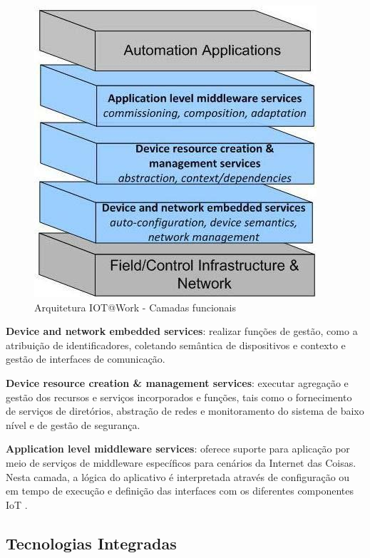 \begin{figure}
\begin{centering}
\includegraphics[width=0.5\linewidth]{Imagens/Cap_3/iot_work}
\par\end{centering}
\caption{Arquitetura IOT@Work - Camadas funcionais \cite{rotondi2011project}\label{fig:iot_work}}
\end{figure}

\textbf{Device and network embedded services}: realizar funções de
gestão, como a atribuição de identificadores, coletando semântica
de dispositivos e contexto e gestão de interfaces de comunicação.

\textbf{Device resource creation \& management services}: executar
agregação e gestão dos recursos e serviços incorporados e funções,
tais como o fornecimento de serviços de diretórios, abstração de redes
e monitoramento do sistema de baixo nível e de gestão de segurança.

\textbf{Application level middleware services}: oferece suporte para
aplicação por meio de serviços de middleware específicos para cenários
da Internet das Coisas. Nesta camada, a lógica do aplicativo é interpretada
através de configuração ou em tempo de execução e definição das interfaces
com os diferentes componentes IoT .

\subsection{Tecnologias Integradas}

